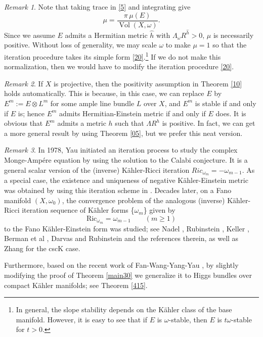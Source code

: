 \documentclass[11pt]{amsart}
\numberwithin{equation}{section}
\theoremstyle{remark}
\newtheorem{rmk}{Remark}[section]
\newcommand{\ka}{K\"ahler }
\newcommand{\he}{Hermitian-Einstein }
\newcommand{\ke}{K\"ahler-Einstein }
\begin{document}
\begin{rmk}\label{d10}
Note that taking trace in \eqref{5} and integrating give
\[
\mu =
\frac{\pi\,\mu(E)} {\operatorname{Vol}(X,\omega)}.
\]
Since we assume $E$ admits a Hermitian metric $\hat h$ with $ \Lambda_\omega R^{\hat h}>0$, $\mu$ is necessarily positive. Without loss of generality, we may scale $\omega$ to make $\mu=1$ so that the iteration procedure takes its simple form \eqref{20}.\footnote{In general, the slope stability depends on the \ka class of the base manifold. However, it is easy to see that if $E$ is $\omega$-stable, then $E$ is $t\omega$-stable for $t>0$.} If we do not make this normalization, then we would have to modify the iteration procedure \eqref{20}.
\end{rmk}



\begin{rmk}\label{i40}
If $X$ is projective, then the positivity assumption in Theorem \ref{10} holds automatically. This is because, in this case, we can replace $E$ by $E^m:=E\otimes L^m$ for some ample line bundle $L$ over $X$, and $E^m$ is stable if and only if $E$ is; hence $E^m$ admits \he metric if and only if $E$ does. It is obvious that $E^m$ admits a metric $h$ such that $ \Lambda R^h$ is positive. In fact, we can get a more general result by using Theorem \ref{05}, but we prefer this neat version.
\end{rmk}


\begin{rmk} In 1978, Yau \cite{yau} initiated an iteration process to study the complex Monge-Amp\'ere equation by using the solution to the Calabi conjecture. It is a general scalar version of the (inverse) K\"ahler-Ricci iteration $Ric_{\omega_m}=-\omega_{m-1}$. As a special case, the existence and uniqueness of negative \ke metric was obtained by using this iteration scheme in \cite{yau}.  Decades later, on a Fano manifold $(X,\omega_0)$, the convergence problem of the analogous (inverse) K\"ahler-Ricci iteration sequence of K\"ahler forms \{$\omega_m$\} given by
\[
\text{Ric}_{\omega_m}=\omega_{m-1} \qquad (m\geq 1)
\]
to the Fano K\"ahler-Einstein form was studied; see Nadel \cite{na}, Rubinstein \cite{yr}, Keller \cite{jk},  Berman et al \cite{B et al}, Darvas and Rubinstein \cite{DR} and the references therein, as well as  Zhang \cite{kz} for the cscK case.
\end{rmk}

Furthermore, based on the recent work of Fan-Wang-Yang-Yau \cite{WYY2}, by slightly modifying the proof of Theorem \ref{main30} we generalize it to Higgs bundles over compact K\"ahler manifolds; see Theorem \ref{415}.
\end{document}
